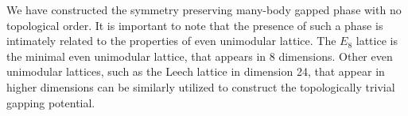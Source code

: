 We have constructed the symmetry preserving many-body gapped phase with no topological order. It is important to note that the presence of such a phase is intimately related to the properties of even unimodular lattice. %
The $E_8$ lattice is the minimal even unimodular lattice, that appears in $8$ dimensions. Other even unimodular lattices, such as the Leech lattice in dimension 24, that appear in higher dimensions can be similarly utilized to construct the topologically trivial gapping potential.

